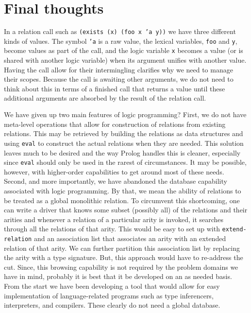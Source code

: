 \section{Final thoughts}
In a relation call such as \texttt{(exists (x) (foo x 'a y))} we have
three different kinds of values.  The symbol \texttt{'a} is a raw
value, the lexical variables, \texttt{foo} and \texttt{y}, become
values as part of the call, and the logic variable \texttt{x} becomes
a value (or is shared with another logic variable) when its argument
unifies with another value.  Having the call allow for their
intermingling clarifies why we need to manage their scopes.  Because
the call is awaiting other arguments, we do not need to think about
this in terms of a finished call that returns a value until these
additional arguments are absorbed by the result of the relation call.

We have given up two main features of logic programming?  First, we do
not have meta-level operations that allow for construction of relations
from existing relations.  This may be retrieved by building the relations
as data structures and using \texttt{eval} to construct the actual
relations when they are needed.  This solution leaves much to be
desired and the way Prolog handles this is cleaner, especially since
\texttt{eval} should only be used in the rarest of circumstances.  It
may be possible, however, with higher-order capabilities to get
around most of these needs.  Second, and more importantly, we have
abandoned the database capability associated with logic
programming. By that, we mean the ability of relations to be
treated as a global monolithic relation.  To circumvent this
shortcoming, one can write a driver that knows some subset (possibly
all) of the relations and their arities and whenever a relation of a
particular arity is invoked, it searches through all the relations of
that arity.  This would be easy to set up with
\texttt{extend-relation} and an association list that associates an
arity with an extended relation of that arity. We can further
partition this association list by replacing the arity with a type
signature.  But, this approach would have to re-address the cut.
Since, this browsing capability is not required by the problem domains
we have in mind, probably it is best that it be developed on an as
needed basis.  From the start we have been developing a tool that
would allow for easy implementation of language-related programs such
as type inferencers, interpreters, and compilers.  These clearly do
not need a global database.

